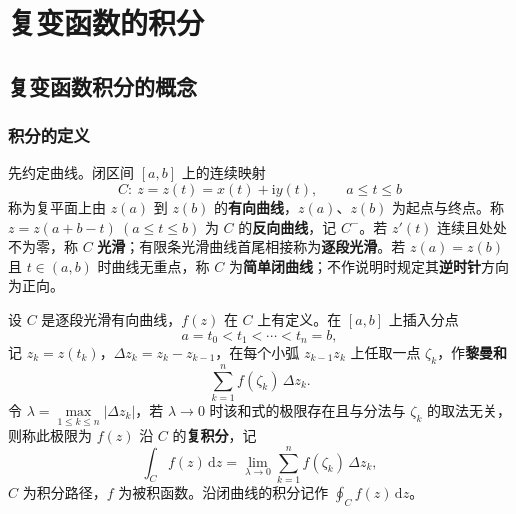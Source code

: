 
\chapter{复变函数的积分}

\section{复变函数积分的概念}

\subsection{积分的定义}
先约定曲线。闭区间 \([a,b]\) 上的连续映射
\[
C:\ z=z(t)=x(t)+\mathrm{i}y(t),\qquad a\leqslant t\leqslant b
\]
称为复平面上由 \(z(a)\) 到 \(z(b)\) 的\textbf{有向曲线}，\(z(a)\)、\(z(b)\) 为起点与终点。称 \(z=z(a+b-t)\ (a\leqslant t\leqslant b)\) 为 \(C\) 的\textbf{反向曲线}，记 \(C^{-}\)。若 \(z'(t)\) 连续且处处不为零，称 \(C\) \textbf{光滑}；有限条光滑曲线首尾相接称为\textbf{逐段光滑}。若 \(z(a)=z(b)\) 且 \(t\in(a,b)\) 时曲线无重点，称 \(C\) 为\textbf{简单闭曲线}；不作说明时规定其\textbf{逆时针}方向为正向。

设 \(C\) 是逐段光滑有向曲线，\(f(z)\) 在 \(C\) 上有定义。在 \([a,b]\) 上插入分点
\[
a=t_{0}<t_{1}<\cdots<t_{n}=b,
\]
记 \(z_{k}=z(t_{k})\)，\(\Delta z_{k}=z_{k}-z_{k-1}\)，在每个小弧 \(z_{k-1}z_{k}\) 上任取一点 \(\zeta_{k}\)，作\textbf{黎曼和}
\[
\sum_{k=1}^{n}f(\zeta_{k})\,\Delta z_{k}.
\]
令 \(\lambda=\max\limits_{1\leqslant k\leqslant n}|\Delta z_{k}|\)，若 \(\lambda\to 0\) 时该和式的极限存在且与分法与 \(\zeta_{k}\) 的取法无关，则称此极限为 \(f(z)\) 沿 \(C\) 的\textbf{复积分}，记
\[
\int_{C}f(z)\,\mathrm{d}z=\lim_{\lambda\to 0}\sum_{k=1}^{n}f(\zeta_{k})\,\Delta z_{k},
\]
\(C\) 为积分路径，\(f\) 为被积函数。沿闭曲线的积分记作 \(\oint_{C}f(z)\,\mathrm{d}z\)。

